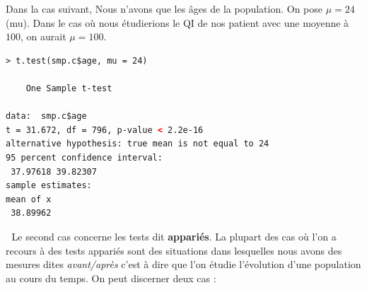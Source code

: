 Dans la cas suivant, Nous n'avons que les âges de la population. On pose $\mu = 24 $ (mu). Dans le cas où nous étudierions le QI de nos patient avec une moyenne à $100$, on aurait $\mu = 100$.
\begin{lstlisting}[language=html]
> t.test(smp.c$age, mu = 24)

	One Sample t-test

data:  smp.c$age
t = 31.672, df = 796, p-value < 2.2e-16
alternative hypothesis: true mean is not equal to 24
95 percent confidence interval:
 37.97618 39.82307
sample estimates:
mean of x 
 38.89962 
\end{lstlisting}
\textcolor{white}{.}\newline
Le second cas concerne les tests dit \textbf{appariés}. La plupart des cas où l'on a recours à des tests appariés sont des situations dans lesquelles nous avons des mesures dites \textit{avant/après} c'est à dire que l'on étudie l'évolution d'une population au cours du temps.\newline
On peut discerner deux cas : 
